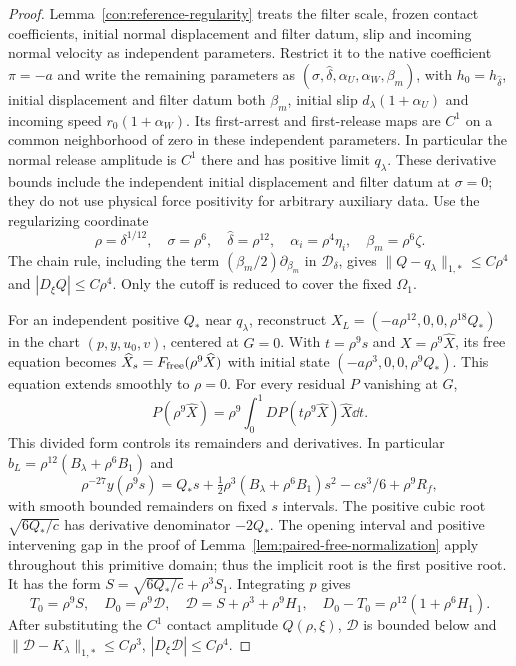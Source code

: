 \begin{proof}
Lemma~\ref{con:reference-regularity} treats
the filter scale, frozen contact coefficients, initial normal
displacement and filter datum, slip and incoming normal velocity as
independent parameters. Restrict it to the native coefficient
$\pi=-a$ and write the remaining parameters as
$(\sigma,\widehat\delta,\alpha_U,\alpha_W,\beta_m)$, with
$h_0=h_{\widehat\delta}$, initial displacement and filter datum both
$\beta_m$, initial slip $d_\lambda(1+\alpha_U)$ and incoming speed
$r_0(1+\alpha_W)$. Its first-arrest and first-release maps are $C^1$
on a common neighborhood of zero in these independent parameters.
In particular the normal
release amplitude is $C^1$ there and has positive limit $q_\lambda$.
These derivative bounds include the independent initial displacement
and filter datum at $\sigma=0$; they do not use physical force
positivity for arbitrary auxiliary data.
Use the regularizing coordinate
\begin{equation}
 \rho=\delta^{1/12},\quad \sigma=\rho^6,\quad
 \widehat\delta=\rho^{12},\quad
 \alpha_i=\rho^4\eta_i,\quad \beta_m=\rho^6\zeta.
 \label{ret:regularizing-scale}
\end{equation}
The chain rule, including the term
$(\beta_m/2)\partial_{\beta_m}$ in $\mathscr D_\delta$, gives
$\|Q-q_\lambda\|_{1,*}\le C\rho^4$ and
$|D_\xi Q|\le C\rho^4$. Only the cutoff is reduced to cover the
fixed $\Omega_1$.

For an independent positive $Q_*$ near $q_\lambda$, reconstruct
$X_L=(-a\rho^{12},0,0,\rho^{18}Q_*)$ in the chart
$(p,y,u_0,v)$, centered at $G=0$. With $t=\rho^9s$ and
$X=\rho^9\widehat X$, its free equation becomes
$\widehat X_s=F_{\rm free}(\rho^9\widehat X)$ with initial state
$(-a\rho^3,0,0,\rho^9Q_*)$. This equation extends smoothly to
$\rho=0$. For every residual $P$ vanishing at $G$,
\[
 P(\rho^9\widehat X)=\rho^9
       \int_0^1DP(t\rho^9\widehat X)\widehat X\dd t.
\]
This divided form controls its remainders and derivatives. In particular
$b_L=\rho^{12}(B_\lambda+\rho^6B_1)$ and
\begin{equation}
 \rho^{-27}y(\rho^9s)
 =Q_*s+\tfrac12\rho^3(B_\lambda+\rho^6B_1)s^2
       -cs^3/6+\rho^9R_f,
 \label{ret:regular-free-gap}
\end{equation}
with smooth bounded remainders on fixed $s$ intervals. The positive
cubic root $\sqrt{6Q_*/c}$ has derivative denominator $-2Q_*$.
The opening interval and positive intervening gap in the proof of
Lemma~\ref{lem:paired-free-normalization} apply throughout this primitive domain;
thus the implicit root is the first positive root. It has the form
$S=\sqrt{6Q_*/c}+\rho^3S_1$. Integrating $p$ gives
\begin{equation}
 T_0=\rho^9S,\quad D_0=\rho^9\mathcal D,\quad
 \mathcal D=S+\rho^3+\rho^9H_1,
 \quad D_0-T_0=\rho^{12}(1+\rho^6H_1).
 \label{ret:regular-free-scale}
\end{equation}
After substituting the $C^1$ contact amplitude $Q(\rho,\xi)$,
$\mathcal D$ is bounded below and
$\|\mathcal D-K_\lambda\|_{1,*}\le C\rho^3$,
$|D_\xi\mathcal D|\le C\rho^4$.


\end{proof}
